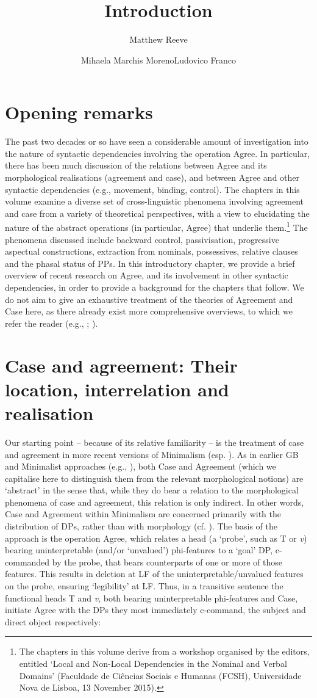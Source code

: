 \documentclass[output=paper]{langsci/langscibook}
\author{Matthew Reeve\affiliation{Zhejiang University}\and Mihaela Marchis Moreno\affiliation{FCSH, Universidade Nova de Lisboa}\lastand Ludovico Franco\affiliation{FCSH, Universidade Nova de Lisboa}}
\title{Introduction}
\begin{document}
\section{Opening remarks}

The past two decades or so have seen a considerable amount of investigation into the nature of syntactic dependencies involving the operation Agree. In particular, there has been much discussion of the relations between Agree and its morphological realisations (agreement and case), and between Agree and other syntactic dependencies (e.g., movement, binding, control). The chapters in this volume examine a diverse set of cross-linguistic phenomena involving agreement and case from a variety of theoretical perspectives, with a view to elucidating the nature of the abstract operations (in particular, Agree) that underlie them.\footnote{The chapters in this volume derive from a workshop organised by the editors, entitled ‘Local and Non-Local Dependencies in the Nominal and Verbal Domains’ (Faculdade de Ciências Sociais e Humanas (FCSH), Universidade Nova de Lisboa, 13 November 2015).} The phenomena discussed include backward control, passivisation, progressive aspectual constructions, extraction from nominals, possessives, relative clauses and the phasal status of PPs. In this introductory chapter, we provide a brief overview of recent research on Agree, and its involvement in other syntactic dependencies, in order to provide a background for the chapters that follow. We do not aim to give an exhaustive treatment of the theories of Agreement and Case here, as there already exist more comprehensive overviews, to which we refer the reader (e.g., \citealt{Bobaljik2008a}; \citealt{Polinsky2014}).

\section{Case and agreement: Their location, interrelation and realisation}
Our starting point – because of its relative familiarity – is the treatment of case and agreement in more recent versions of Minimalism (esp. \citealt{Chomsky2000,Chomsky2000,Pesetsky2001,Pesetsky2007}). As in earlier GB and Minimalist approaches (e.g., \citealt{Chomsky1980,Chomsky1981,Chomsky1985}), both Case and Agreement (which we capitalise here to distinguish them from the relevant morphological notions) are ‘abstract’ in the sense that, while they do bear a relation to the morphological phenomena of case and agreement, this relation is only indirect. In other words, Case and Agreement within Minimalism are concerned primarily with the distribution of DPs, rather than with morphology (cf. \citealt{Bobaljik2008a}). The basis of the approach is the operation Agree, which relates a head (a ‘probe’, such as T or \textit{v}) bearing uninterpretable (and/or ‘unvalued’) phi-features to a ‘goal’ DP, c-commanded by the probe, that bears counterparts of one or more of those features. This results in deletion at LF of the uninterpretable/unvalued features on the probe, ensuring ‘legibility’ at LF. Thus, in a transitive sentence the functional heads T and \textit{v}, both bearing uninterpretable phi-features and Case, initiate Agree with the DPs they most immediately c-command, the subject and direct object respectively:
\end{document}
